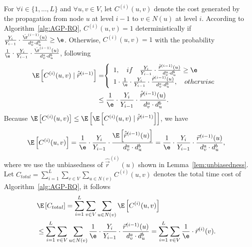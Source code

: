 For $\forall i \in \{1,...,L\}$ and $\forall u,v \in V$, let $C^{(i)}(u,v)$ denote the cost generated by the propagation from node $u$ at level $i-1$ to $v \in N(u)$ at level $i$. According to Algorithm~\ref{alg:AGP-RQ}, $C^{(i)}(u,v)=1$ deterministically if $\frac{Y_{i}}{Y_{i-1}} \cdot \frac{\hat{\r}^{(i-1)}(u)}{d_v^a\cdot d_u^b}\ge \e$. Otherwise, $C^{(i)}(u,v)=1$ with the probability $\frac{1}{\e}\cdot \frac{Y_{i}}{Y_{i-1}} \cdot \frac{\hat{\r}^{(i-1)}(u)}{d_v^a\cdot d_u^b}$, following 
\vspace{-2mm}
\begin{equation}\nonumber
\vspace{-1mm}
\begin{aligned}
\hspace{-1mm} \E \left[ C^{(i)}(u,v)\mid \hat{\vec{r}}^{(i-1)} \right]
&=\hspace{-1mm} \left\{
\begin{array}{ll}
1, \quad if \quad \frac{Y_{i}}{Y_{i-1}}\cdot \frac{\hat{\vec{r}}^{(i-1)}(u)}{d_v^a\cdot d_u^b}\ge  \e\\
1 \cdot \frac{1}{\e}\cdot \frac{Y_{i}}{Y_{i-1}} \cdot \frac{\hat{\vec{r}}^{(i-1)}(u)}{d_v^a\cdot d_u^b}, \quad otherwise
\end{array} 
\right.\\
&\le \frac{1}{\e}\cdot \frac{Y_{i}}{Y_{i-1}} \cdot \frac{\hat{\vec{r}}^{(i-1)}(u)}{d_v^a\cdot d_u^b}.
\end{aligned}
\end{equation}
Because $\E \left[ C^{(i)}(u,v) \right] \le \E \left[\E \left[ C^{(i)}(u,v)\mid \hat{\vec{r}}^{(i-1)} \right]\right]$, we have
\vspace{-2mm}
\begin{equation}\nonumber
\vspace{-1mm}
	\begin{aligned}
	\E \left[ C^{(i)}(u,v) \right]=\frac{1}{\e}\cdot \frac{Y_{i}}{Y_{i-1}}  \cdot \frac{\E \left[ \hat{\vec{r}}^{(i-1)}(u)\right]}{d_v^a\cdot d_u^b}
	=\frac{1}{\e}\cdot \frac{Y_{i}}{Y_{i-1}} \cdot \frac{\vec{r}^{(i-1)}(u)}{d_v^a\cdot d_u^b}, 
	\end{aligned}
\end{equation} 
where we use the unbiasedness of $\hat{\vec{r}}^{(i)}(u)$ shown in Lemma~\ref{lem:unbiasedness}. Let $C_{total}=\sum_{i=1}^{L} \sum_{v\in V} \sum_{u \in N(v)} C^{(i)}(u,v)$ denotes the total time cost of Algorithm~\ref{alg:AGP-RQ}, it follows 
\vspace{-2mm}
\begin{equation}\nonumber
\vspace{-1mm}
	\begin{aligned}
	&\E \left[ C_{total} \right]=\sum_{i=1}^{L} \sum_{v\in V} \sum_{u \in N(v)} \E \left[C^{(i)}(u,v)\right]\\
	&\le\sum_{i=1}^{L} \sum_{v\in V} \sum_{u \in N(v)}\frac{1}{\e}\cdot \frac{Y_{i}}{Y_{i-1}} \cdot \frac{\vec{r}^{(i-1)}(u)}{d_v^a\cdot d_u^b}
	=\sum_{i=1}^{L} \sum_{v\in V} \frac{1}{\e}\cdot \vec{r}^{(i)}(v).
	\end{aligned}
\end{equation}
